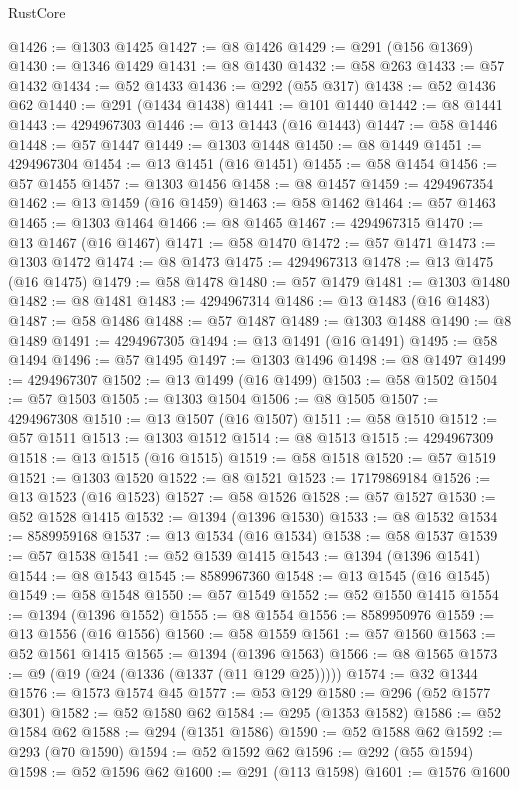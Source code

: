 \begin{lexlean}{RustCore}
\begin{coremodule}
@1426 := @1303 @1425
@1427 := @8 @1426
@1429 := @291 (@156 @1369)
@1430 := @1346 @1429
@1431 := @8 @1430
@1432 := @58 @263
@1433 := @57 @1432
@1434 := @52 @1433
@1436 := @292 (@55 @317)
@1438 := @52 @1436 @62
@1440 := @291 (@1434 @1438)
@1441 := @101 @1440
@1442 := @8 @1441
@1443 := 4294967303
@1446 := @13 @1443 (@16 @1443)
@1447 := @58 @1446
@1448 := @57 @1447
@1449 := @1303 @1448
@1450 := @8 @1449
@1451 := 4294967304
@1454 := @13 @1451 (@16 @1451)
@1455 := @58 @1454
@1456 := @57 @1455
@1457 := @1303 @1456
@1458 := @8 @1457
@1459 := 4294967354
@1462 := @13 @1459 (@16 @1459)
@1463 := @58 @1462
@1464 := @57 @1463
@1465 := @1303 @1464
@1466 := @8 @1465
@1467 := 4294967315
@1470 := @13 @1467 (@16 @1467)
@1471 := @58 @1470
@1472 := @57 @1471
@1473 := @1303 @1472
@1474 := @8 @1473
@1475 := 4294967313
@1478 := @13 @1475 (@16 @1475)
@1479 := @58 @1478
@1480 := @57 @1479
@1481 := @1303 @1480
@1482 := @8 @1481
@1483 := 4294967314
@1486 := @13 @1483 (@16 @1483)
@1487 := @58 @1486
@1488 := @57 @1487
@1489 := @1303 @1488
@1490 := @8 @1489
@1491 := 4294967305
@1494 := @13 @1491 (@16 @1491)
@1495 := @58 @1494
@1496 := @57 @1495
@1497 := @1303 @1496
@1498 := @8 @1497
@1499 := 4294967307
@1502 := @13 @1499 (@16 @1499)
@1503 := @58 @1502
@1504 := @57 @1503
@1505 := @1303 @1504
@1506 := @8 @1505
@1507 := 4294967308
@1510 := @13 @1507 (@16 @1507)
@1511 := @58 @1510
@1512 := @57 @1511
@1513 := @1303 @1512
@1514 := @8 @1513
@1515 := 4294967309
@1518 := @13 @1515 (@16 @1515)
@1519 := @58 @1518
@1520 := @57 @1519
@1521 := @1303 @1520
@1522 := @8 @1521
@1523 := 17179869184
@1526 := @13 @1523 (@16 @1523)
@1527 := @58 @1526
@1528 := @57 @1527
@1530 := @52 @1528 @1415
@1532 := @1394 (@1396 @1530)
@1533 := @8 @1532
@1534 := 8589959168
@1537 := @13 @1534 (@16 @1534)
@1538 := @58 @1537
@1539 := @57 @1538
@1541 := @52 @1539 @1415
@1543 := @1394 (@1396 @1541)
@1544 := @8 @1543
@1545 := 8589967360
@1548 := @13 @1545 (@16 @1545)
@1549 := @58 @1548
@1550 := @57 @1549
@1552 := @52 @1550 @1415
@1554 := @1394 (@1396 @1552)
@1555 := @8 @1554
@1556 := 8589950976
@1559 := @13 @1556 (@16 @1556)
@1560 := @58 @1559
@1561 := @57 @1560
@1563 := @52 @1561 @1415
@1565 := @1394 (@1396 @1563)
@1566 := @8 @1565
@1573 := @9 (@19 (@24 (@1336 (@1337 (@11 @129 @25)))))
@1574 := @32 @1344
@1576 := @1573 @1574 @45
@1577 := @53 @129
@1580 := @296 (@52 @1577 @301)
@1582 := @52 @1580 @62
@1584 := @295 (@1353 @1582)
@1586 := @52 @1584 @62
@1588 := @294 (@1351 @1586)
@1590 := @52 @1588 @62
@1592 := @293 (@70 @1590)
@1594 := @52 @1592 @62
@1596 := @292 (@55 @1594)
@1598 := @52 @1596 @62
@1600 := @291 (@113 @1598)
@1601 := @1576 @1600

\end{coremodule}
\end{lexlean}
